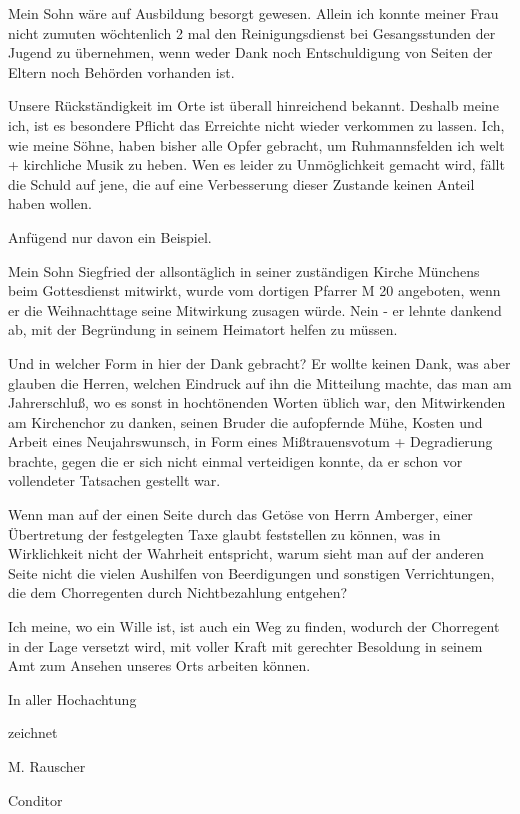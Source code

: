 Mein Sohn wäre auf Ausbildung besorgt gewesen. Allein ich konnte meiner Frau
nicht zumuten wöchtenlich 2 mal den Reinigungsdienst bei Gesangsstunden der
Jugend zu übernehmen, wenn weder Dank noch Entschuldigung von Seiten der Eltern
noch Behörden vorhanden ist.

Unsere Rückständigkeit im Orte ist überall hinreichend bekannt. Deshalb meine
ich, ist es besondere Pflicht das Erreichte nicht wieder verkommen zu lassen.
Ich, wie meine Söhne, haben bisher alle Opfer gebracht, um Ruhmannsfelden ich
welt + kirchliche Musik zu heben. Wen es leider zu Unmöglichkeit gemacht wird,
fällt die Schuld auf jene, die auf eine Verbesserung dieser Zustande keinen
Anteil haben wollen.

Anfügend nur davon ein Beispiel.

Mein Sohn Siegfried der allsontäglich in seiner zuständigen Kirche Münchens beim
Gottesdienst mitwirkt, wurde vom dortigen Pfarrer M 20 angeboten, wenn er die
Weihnachttage seine Mitwirkung zusagen würde. Nein - er lehnte dankend ab, mit
der Begründung in seinem Heimatort helfen zu müssen.

Und in welcher Form in hier der Dank gebracht? Er wollte keinen Dank, was aber
glauben die Herren, welchen Eindruck auf ihn die Mitteilung machte, das man am
Jahrerschluß, wo es sonst in hochtönenden Worten üblich war, den Mitwirkenden am
Kirchenchor zu danken, seinen Bruder die aufopfernde Mühe, Kosten und Arbeit
eines Neujahrswunsch, in Form eines Mißtrauensvotum + Degradierung brachte,
gegen die er sich nicht einmal verteidigen konnte, da er schon vor vollendeter
Tatsachen gestellt war.

Wenn man auf der einen Seite durch das Getöse von Herrn Amberger, einer
Übertretung der festgelegten Taxe glaubt feststellen zu können, was in
Wirklichkeit nicht der Wahrheit entspricht, warum sieht man auf der anderen
Seite nicht die vielen Aushilfen von Beerdigungen und sonstigen Verrichtungen,
die dem Chorregenten durch Nichtbezahlung entgehen?

Ich meine, wo ein Wille ist, ist auch ein Weg zu finden, wodurch der Chorregent
in der Lage versetzt wird, mit voller Kraft mit gerechter Besoldung in seinem
Amt zum Ansehen unseres Orts arbeiten können.



    In aller Hochachtung

        zeichnet

        M. Rauscher

            Conditor



